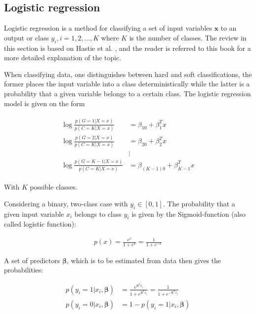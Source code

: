 \documentclass[../main.tex]{subfiles}
\begin{document}
\subsection{Logistic regression}
\label{sec:logreg}
Logistic regression is a method for classifying a set of input variables \ensuremath{\boldsymbol{x}} to an output or class \ensuremath{y_i, i=1,2, \ldots,K} where $K$ is the number of classes. The review in this section is based on Hastie et al. \cite[ch.~4]{HastieTrevor2009EoSL}, and the reader is referred to this book for a more detailed explanation of the topic.

When classifying data, one distinguishes between hard and soft classifications, the former places the input variable into a class deterministically while the latter is a probability that a given variable belongs to a certain class. The logistic regression model is given on the form

\begin{align*}
    \begin{split}
        \log\frac{p(G=1|X=x)}{p(C=K|X=x)}&=\beta_{10}+\beta_1^Tx \\
        \log\frac{p(G=2|X=x)}{p(C=K|X=x)}&=\beta_{20}+\beta_2^Tx \\
        &\vdots\\ 
        \log\frac{p(G=K-1|X=x)}{p(C=K|X=x)}&=\beta_{(K-1)0}+\beta_{K-1}^Tx
    \end{split}
\end{align*}

With $K$ possible classes.

Considering a binary, two-class case with \ensuremath{y_i \in [0,1]}. The probability that a given input variable $x_i$ belongs to class $y_i$ is given by the Sigmoid-function (also called logistic function):

\begin{align*}
    p(x) = \frac{e^x}{1+e^x}=\frac{1}{1+e^{-x}}
    \label{eq:sigmoid}
\end{align*}

A set of predictors \ensuremath{\boldsymbol{\beta}}, which is to be estimated from data then gives the probabilities:

\begin{align*}
    p(y_i=1|x_i,\boldsymbol{\beta})&=\frac{e^{\boldsymbol{\beta}^Tx_i}}{1+e^{\boldsymbol{\beta}^Tx_i}}=\frac{1}{1+e^{-\boldsymbol{\beta}^Tx_i}} \\
    p(y_i=0|x_i,\boldsymbol{\beta})&=1-p(y_i=1|x_i,\boldsymbol{\beta})
\end{align*}
\end{document}
